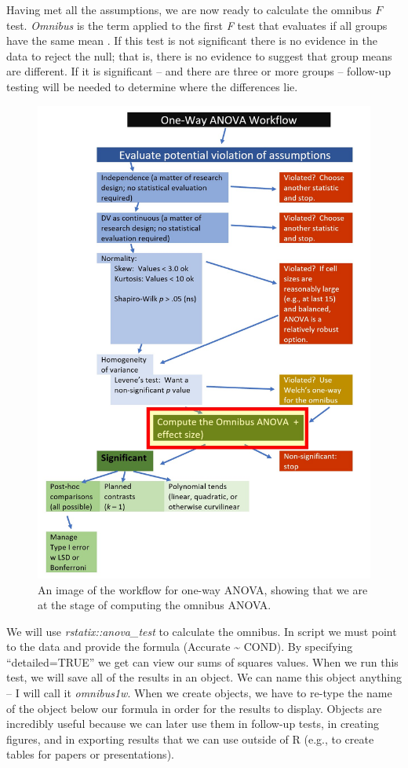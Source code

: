 \documentclass[
  11pt,
]{book}
\begin{document}
Having met all the assumptions, we are now ready to calculate the omnibus \(F\) test. \emph{Omnibus} is the term applied to the first \emph{F} test that evaluates if all groups have the same mean \citep{chen_relationship_2018}. If this test is not significant there is no evidence in the data to reject the null; that is, there is no evidence to suggest that group means are different. If it is significant -- and there are three or more groups -- follow-up testing will be needed to determine where the differences lie.

\begin{figure}
\centering
\includegraphics{images/oneway/OnewayWrkFlw_omnibus.jpg}
\caption{An image of the workflow for one-way ANOVA, showing that we are at the stage of computing the omnibus ANOVA.}
\end{figure}

We will use \emph{rstatix::anova\_test} to calculate the omnibus. In script we must point to the data and provide the formula (Accurate \textasciitilde{} COND). By specifying ``detailed=TRUE'' we get can view our sums of squares values. When we run this test, we will save all of the results in an object. We can name this object anything -- I will call it \emph{omnibus1w}. When we create objects, we have to re-type the name of the object below our formula in order for the results to display. Objects are incredibly useful because we can later use them in follow-up tests, in creating figures, and in exporting results that we can use outside of R (e.g., to create tables for papers or presentations).
\end{document}
